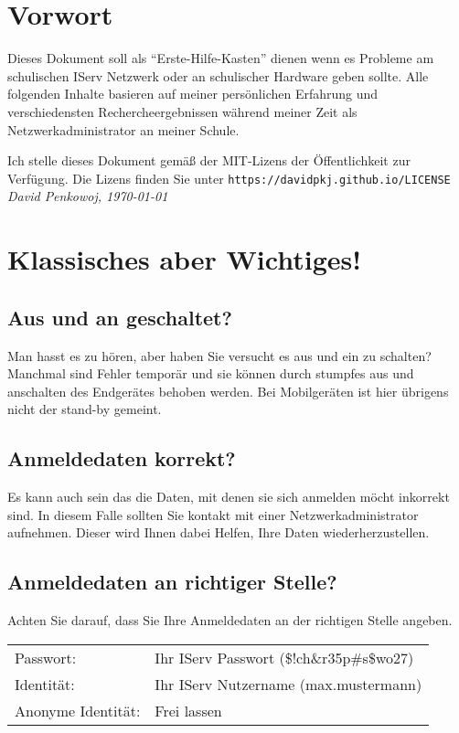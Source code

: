 \documentclass[12pt, a4paper]{article}
\begin{document}
  \section*{Vorwort}
  Dieses Dokument soll als "`Erste-Hilfe-Kasten"' dienen wenn es Probleme am schulischen IServ Netzwerk oder an schulischer Hardware geben sollte. 
  Alle folgenden Inhalte basieren auf meiner persönlichen Erfahrung und verschiedensten Rechercheergebnissen während meiner Zeit als Netzwerkadministrator an meiner Schule.

  Ich stelle dieses Dokument gemäß der MIT-Lizens der Öffentlichkeit zur Verfügung. 
  Die Lizens finden Sie unter \texttt{https://davidpkj.github.io/LICENSE}
  \newline
  \newline
  {\em David Penkowoj, \today}

  \tableofcontents
  \clearpage

  \section{Klassisches aber Wichtiges!}
  
  \subsection{Aus und an geschaltet?}
  Man hasst es zu hören, aber haben Sie versucht es aus und ein zu schalten?
  Manchmal sind Fehler temporär und sie können durch stumpfes aus und anschalten des Endgerätes behoben werden. 
  Bei Mobilgeräten ist hier übrigens nicht der stand-by gemeint.

  \subsection{Anmeldedaten korrekt?}
  Es kann auch sein das die Daten, mit denen sie sich anmelden möcht inkorrekt sind.
  In diesem Falle sollten Sie kontakt mit einer Netzwerkadministrator aufnehmen.
  Dieser wird Ihnen dabei Helfen, Ihre Daten wiederherzustellen.

  \subsection{Anmeldedaten an richtiger Stelle?}
  Achten Sie darauf, dass Sie Ihre Anmeldedaten an der richtigen Stelle angeben.
  \newline
  \newline
  \begin{tabular}{l l}
    Passwort:             & Ihr IServ Passwort (\$!ch\&r35p\#s\$wo27) \\
    Identität:            & Ihr IServ Nutzername (max.mustermann) \\
    Anonyme Identität:    & Frei lassen \\
  \end{tabular}
\end{document}
